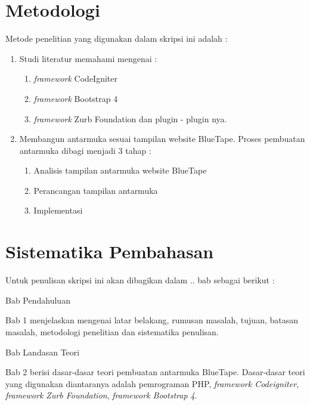 \section{Metodologi}
\label{sec:metlit}
%
Metode penelitian yang digunakan dalam skripsi ini adalah :
\begin{enumerate}
	\item Studi literatur memahami mengenai :
	\begin{enumerate}
		\item \textit{framework} CodeIgniter
		\item \textit{framework} Bootstrap 4
		\item \textit{framework} Zurb Foundation dan plugin - plugin nya.
	\end{enumerate}
	\item  Membangun antarmuka sesuai tampilan website BlueTape. Proses pembuatan antarmuka dibagi menjadi 3 tahap :
	\begin{enumerate}
		\item Analisis tampilan antarmuka website BlueTape
		\item Perancangan tampilan antarmuka
		\item Implementasi		
	\end{enumerate}
\end{enumerate}


\section{Sistematika Pembahasan}
\label{sec:sispem}
Untuk penulisan skripsi ini akan dibagikan dalam .. bab sebagai berikut :

\noindent Bab Pendahuluan

\noindent Bab 1 menjelaskan mengenai latar belakang, rumusan masalah, tujuan, batasan masalah, metodologi penelitian dan sistematika penulisan.


\noindent Bab Landasan Teori

\noindent Bab 2 berisi dasar-dasar teori pembuatan antarmuka BlueTape. Dasar-dasar teori yang digunakan diantaranya adalah pemrograman PHP, \textit{framework Codeigniter}, \textit{framework Zurb Foundation}, \textit{framework Bootstrap 4}.


